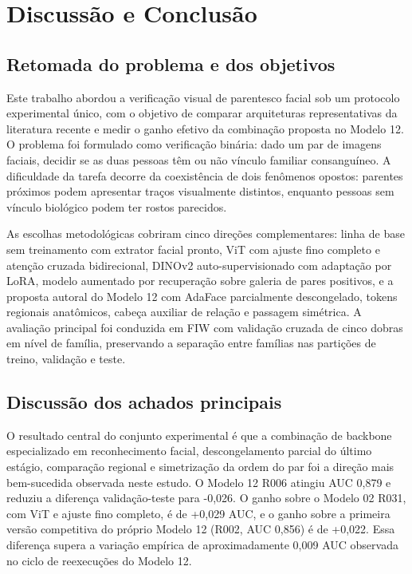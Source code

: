 \chapter[Discussão e Conclusão]{Discussão e Conclusão}
\label{cap:conclusao}

\section{Retomada do problema e dos objetivos}

Este trabalho abordou a verificação visual de parentesco facial sob um protocolo experimental único, com o objetivo de comparar arquiteturas representativas da literatura recente e medir o ganho efetivo da combinação proposta no Modelo 12. O problema foi formulado como verificação binária: dado um par de imagens faciais, decidir se as duas pessoas têm ou não vínculo familiar consanguíneo. A dificuldade da tarefa decorre da coexistência de dois fenômenos opostos: parentes próximos podem apresentar traços visualmente distintos, enquanto pessoas sem vínculo biológico podem ter rostos parecidos.

As escolhas metodológicas cobriram cinco direções complementares: linha de base sem treinamento com extrator facial pronto, ViT com ajuste fino completo e atenção cruzada bidirecional, DINOv2 auto-supervisionado com adaptação por LoRA, modelo aumentado por recuperação sobre galeria de pares positivos, e a proposta autoral do Modelo 12 com AdaFace parcialmente descongelado, tokens regionais anatômicos, cabeça auxiliar de relação e passagem simétrica. A avaliação principal foi conduzida em FIW com validação cruzada de cinco dobras em nível de família, preservando a separação entre famílias nas partições de treino, validação e teste.

\section{Discussão dos achados principais}

O resultado central do conjunto experimental é que a combinação de backbone especializado em reconhecimento facial, descongelamento parcial do último estágio, comparação regional e simetrização da ordem do par foi a direção mais bem-sucedida observada neste estudo. O Modelo 12 R006 atingiu AUC 0,879 e reduziu a diferença validação-teste para -0,026. O ganho sobre o Modelo 02 R031, com ViT e ajuste fino completo, é de +0,029 AUC, e o ganho sobre a primeira versão competitiva do próprio Modelo 12 (R002, AUC 0,856) é de +0,022. Essa diferença supera a variação empírica de aproximadamente 0,009 AUC observada no ciclo de reexecuções do Modelo 12.


